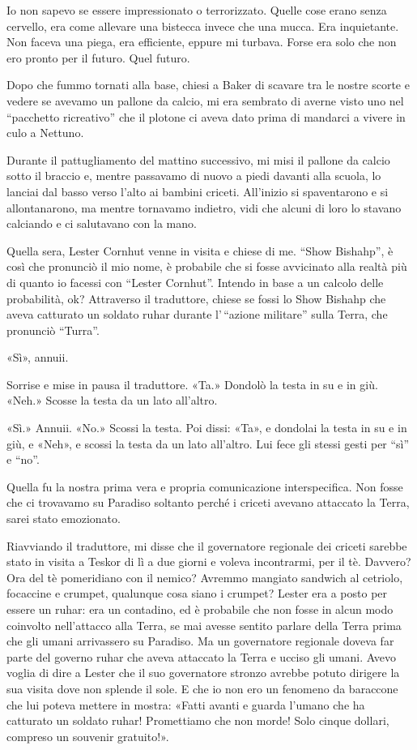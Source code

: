 Io non sapevo se essere impressionato o terrorizzato. Quelle cose erano
senza cervello, era come allevare una bistecca invece che una mucca. Era
inquietante. Non faceva una piega, era efficiente, eppure mi turbava.
Forse era solo che non ero pronto per il futuro. Quel futuro.

Dopo che fummo tornati alla base, chiesi a Baker di scavare tra le
nostre scorte e vedere se avevamo un pallone da calcio, mi era sembrato
di averne visto uno nel ``pacchetto ricreativo'' che il plotone ci aveva
dato prima di mandarci a vivere in culo a Nettuno.

Durante il pattugliamento del mattino successivo, mi misi il pallone da
calcio sotto il braccio e, mentre passavamo di nuovo a piedi davanti
alla scuola, lo lanciai dal basso verso l'alto ai bambini criceti.
All'inizio si spaventarono e si allontanarono, ma mentre tornavamo
indietro, vidi che alcuni di loro lo stavano calciando e ci salutavano
con la mano.

Quella sera, Lester Cornhut venne in visita e chiese di me. ``Show
Bishahp'', è così che pronunciò il mio nome, è probabile che si fosse
avvicinato alla realtà più di quanto io facessi con ``Lester Cornhut''.
Intendo in base a un calcolo delle probabilità, ok? Attraverso il
traduttore, chiese se fossi lo Show Bishahp che aveva catturato un
soldato ruhar durante l'\,``azione militare'' sulla Terra, che pronunciò
``Turra''.

«Sì», annuii.

Sorrise e mise in pausa il traduttore. «Ta.» Dondolò la testa in su e in
giù. «Neh.» Scosse la testa da un lato all'altro.

«Sì.» Annuii. «No.» Scossi la testa. Poi dissi: «Ta», e dondolai la
testa in su e in giù, e «Neh», e scossi la testa da un lato all'altro.
Lui fece gli stessi gesti per ``sì'' e ``no''.

Quella fu la nostra prima vera e propria comunicazione interspecifica.
Non fosse che ci trovavamo su Paradiso soltanto perché i criceti avevano
attaccato la Terra, sarei stato emozionato.

Riavviando il traduttore, mi disse che il governatore regionale dei
criceti sarebbe stato in visita a Teskor di lì a due giorni e voleva
incontrarmi, per il tè. Davvero? Ora del tè pomeridiano con il nemico?
Avremmo mangiato sandwich al cetriolo, focaccine e crumpet, qualunque
cosa siano i crumpet? Lester era a posto per essere un ruhar: era un
contadino, ed è probabile che non fosse in alcun modo coinvolto
nell'attacco alla Terra, se mai avesse sentito parlare della Terra prima
che gli umani arrivassero su Paradiso. Ma un governatore regionale
doveva far parte del governo ruhar che aveva attaccato la Terra e ucciso
gli umani. Avevo voglia di dire a Lester che il suo governatore stronzo
avrebbe potuto dirigere la sua visita dove non splende il sole. E che io
non ero un fenomeno da baraccone che lui poteva mettere in mostra:
«Fatti avanti e guarda l'umano che ha catturato un soldato ruhar!
Promettiamo che non morde! Solo cinque dollari, compreso un souvenir
gratuito!».

